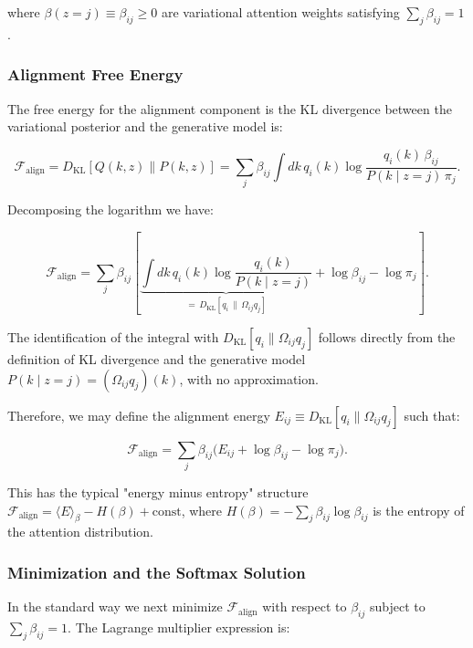 \documentclass[twoside,11pt]{article}
\begin{document}
where $\beta(z = j) \equiv \beta_{ij} \geq 0$ are variational attention weights satisfying $\sum_j \beta_{ij} = 1$.

\subsubsection{Alignment Free Energy}

The free energy for the alignment component is the KL divergence between the variational posterior and the generative model is:

\begin{equation}
\mathcal{F}_{\text{align}} = D_{\mathrm{KL}}[Q(k,z) \| P(k,z)] = \sum_j \beta_{ij} \int dk\, q_i(k) \log \frac{q_i(k)\, \beta_{ij}}{P(k \mid z{=}j)\, \pi_j}.
\end{equation}

Decomposing the logarithm we have:

\begin{equation}
\mathcal{F}_{\text{align}} = \sum_j \beta_{ij} \left[ \underbrace{\int dk\, q_i(k) \log \frac{q_i(k)}{P(k \mid z{=}j)}}_{= \, D_{\mathrm{KL}}[q_i \,\|\, \Omega_{ij} q_j]} + \log \beta_{ij} - \log \pi_j \right].
\label{eq:mixture_free_energy}
\end{equation}

The identification of the integral with $D_{\mathrm{KL}}[q_i \| \Omega_{ij} q_j]$ follows directly from the definition of KL divergence and the generative model $P(k \mid z{=}j) = (\Omega_{ij} q_j)(k)$, with no approximation.

Therefore, we may define the alignment energy $E_{ij} \equiv D_{\mathrm{KL}}[q_i \| \Omega_{ij} q_j]$ such that:

\begin{equation}
\mathcal{F}_{\text{align}} = \sum_j \beta_{ij} \big( E_{ij} + \log \beta_{ij} - \log \pi_j \big).
\label{eq:mixture_energy_entropy}
\end{equation}

This has the typical "energy minus entropy" structure $\mathcal{F}_{\text{align}} = \langle E \rangle_\beta - H(\beta) + \text{const}$, where $H(\beta) = -\sum_j \beta_{ij} \log \beta_{ij}$ is the entropy of the attention distribution.

\subsubsection{Minimization and the Softmax Solution}

In the standard way we next minimize $\mathcal{F}_{\text{align}}$ with respect to $\beta_{ij}$ subject to $\sum_j \beta_{ij} = 1$. The Lagrange multiplier expression is:
\end{document}
